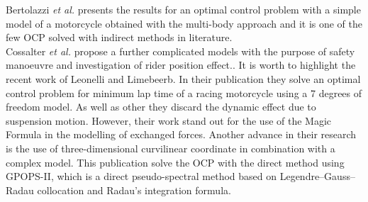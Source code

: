 Bertolazzi \textit{et al.}\cite{bertolazzi2005symbolic} presents the results for an optimal control problem with a simple model of a motorcycle obtained with the multi-body approach and it is one of the few OCP solved with indirect methods in literature.\cite{biral2016notes}\\
Cossalter \textit{et al.} propose a further complicated models with the purpose of safety manoeuvre and investigation of rider position effect.\cite{cossalter2013optimization,massaro2010virtual}.
It is worth to highlight the recent work of Leonelli and Limebeerb\cite{leonelli2019optimal}. In their publication they solve an optimal control problem for minimum lap time of a racing motorcycle using a 7 degrees of freedom model. As well as other they discard the dynamic effect due to suspension motion. However, their work stand out for the use of the Magic Formula \cite{pacejka2012tire} in the modelling of exchanged forces. Another advance in their research is the use of three-dimensional curvilinear coordinate in combination with a complex model. This publication solve the OCP with the direct method using GPOPS-II\cite{patterson2014gpops}, which is a direct pseudo-spectral method based on Legendre–Gauss–Radau collocation and Radau’s integration formula.
%
